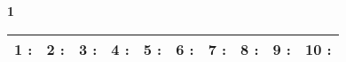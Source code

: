 \documentclass[a4paper, 11pt]{article}
\begin{document}
{\Large\bf 1 } \hspace{1.5cm}
\begin{tabular}{| l|l|l|l|l|l|l|l|l|l| }
\hline
{\large 1 }: \hspace*{0.5cm}
& {\large 2 }: \hspace*{0.5cm}
& {\large 3 }: \hspace*{0.5cm}
& {\large 4 }: \hspace*{0.5cm}
& {\large 5 }: \hspace*{0.5cm}
& {\large 6 }: \hspace*{0.5cm}
& {\large 7 }: \hspace*{0.5cm}
& {\large 8 }: \hspace*{0.5cm}
& {\large 9 }: \hspace*{0.5cm}
& {\large 10 }: \hspace*{0.5cm}
\\ 
 \hline
\end{tabular}
\vspace*{1cm} 
\end{document}
